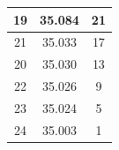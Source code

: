\documentclass{article}
\theoremstyle{mytheoremstyle}
\theoremstyle{mytheoremstyle}
\theoremstyle{myproblemstyle}
\begin{document}
\begin{table}[h]
\begin{tabular}{|c|c|c|}
	\rowcolor[HTML]{F9CDAD} 
	19               & 35.084                                                                            & 21                                                                                    \\ \hline
	\rowcolor[HTML]{F9CDAD} 
	21               & 35.033                                                                            & 17                                                                                    \\ \hline
	\rowcolor[HTML]{F9CDAD} 
	20               & 35.030                                                                            & 13                                                                                    \\ \hline
	\rowcolor[HTML]{F9CDAD} 
	22               & 35.026                                                                            & 9                                                                                     \\ \hline
	\rowcolor[HTML]{F9CDAD} 
	23               & 35.024                                                                            & 5                                                                                     \\ \hline
	\rowcolor[HTML]{F9CDAD} 
	24               & 35.003                                                                            & 1                                                                                     \\ \hline
	\end{tabular}
	\end{table}
	
\end{document}

